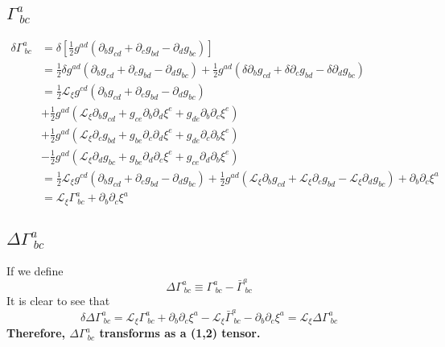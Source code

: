 \documentclass{article}
\begin{document}
\subsection{$\Gamma^{a}_{~bc}$}
\begin{align*}
\delta \Gamma^{a}_{~bc} & = \delta [\frac{1}{2}g^{ad}(\partial_{b}g_{cd} + \partial_{c}g_{bd} -\partial_{d}g_{bc})]\\
& = \frac{1}{2}\delta g^{ad}(\partial_{b}g_{cd} + \partial_{c}g_{bd} -\partial_{d}g_{bc}) + \frac{1}{2}g^{ad}(\delta \partial_{b}g_{cd} + \delta \partial_{c}g_{bd} - \delta \partial_{d}g_{bc})\\
& = \frac{1}{2}\mathcal{L}_{\xi}g^{cd}(\partial_{b}g_{cd} + \partial_{c}g_{bd} -\partial_{d}g_{bc})\\
& + \frac{1}{2}g^{ad}(\mathcal{L}_{\xi}\partial_{b}g_{cd} + g_{ce}\partial_{b}\partial_{d}\xi^{e} + g_{de}\partial_{b}\partial_{c}\xi^{e})\\
& + \frac{1}{2}g^{ad}(\mathcal{L}_{\xi}\partial_{c}g_{bd} + g_{be}\partial_{c}\partial_{d}\xi^{e} + g_{de}\partial_{c}\partial_{b}\xi^{e})\\
& - \frac{1}{2}g^{ad}(\mathcal{L}_{\xi}\partial_{d}g_{bc} + g_{be}\partial_{d}\partial_{c}\xi^{e} + g_{ce}\partial_{d}\partial_{b}\xi^{e})\\
& = \frac{1}{2}\mathcal{L}_{\xi}g^{cd}(\partial_{b}g_{cd} + \partial_{c}g_{bd} -\partial_{d}g_{bc}) + \frac{1}{2}g^{ad}(\mathcal{L}_{\xi}\partial_{b}g_{cd} + \mathcal{L}_{\xi}\partial_{c}g_{bd} - \mathcal{L}_{\xi}\partial_{d}g_{bc}) + \partial_{b}\partial_{c}\xi^{a}\\
& = \mathcal{L}_{\xi}\Gamma^{a}_{~bc} + \partial_{b}\partial_{c}\xi^{a}
\end{align*}
\subsection{$\Delta \Gamma^{a}_{~bc}$}
If we define
\[
\Delta \Gamma^{a}_{~bc} \equiv \Gamma^{a}_{~bc} - {\bar \Gamma}^{a}_{~bc}
\]
It is clear to see that
\[
\boxed{
\delta \Delta \Gamma^{a}_{~bc} = \mathcal{L}_{\xi}\Gamma^{a}_{~bc} + \partial_{b}\partial_{c}\xi^{a} - \mathcal{L}_{\xi}{\bar \Gamma}^{a}_{~bc} - \partial_{b}\partial_{c}\xi^{a} = \mathcal{L}_{\xi}\Delta \Gamma^{a}_{~bc}
}
\]
{\bf {\color{red}Therefore, $\Delta \Gamma^{a}_{~bc}$ transforms as a (1,2) tensor.}}
\end{document}
